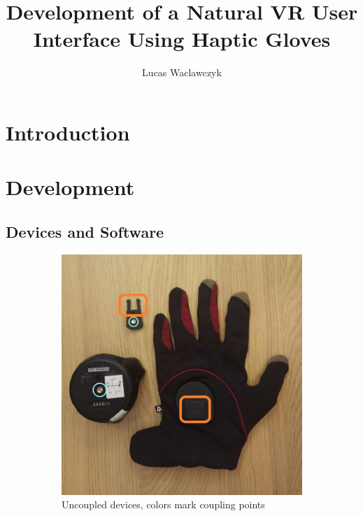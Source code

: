 \documentclass[hyperref, bachelorofscience]{cgvpub}
\author{Lucas Waclawczyk}
\title{Development of a Natural VR User Interface Using Haptic Gloves}
\begin{document}
\glsaddall
	
\chapter{Introduction}


\chapter{Development}
\section{Devices and Software}
\begin{figure}
	\begin{subfigure}{.49\linewidth}
		\includegraphics[width=\linewidth]{../pics/devices_uncoupled}
		\caption{Uncoupled devices, colors mark coupling points}
		\label{fig:devices:unc}
	\end{subfigure}
	\hfill
	\begin{subfigure}{.49\linewidth}

\end{subfigure}
\end{figure}
\end{document}
